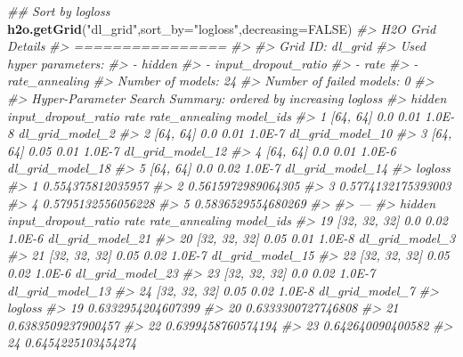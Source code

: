 \documentclass[]{book}
\newenvironment{Shaded}{\begin{snugshade}}{\end{snugshade}}
\newcommand{\CommentTok}[1]{\textcolor[rgb]{0.56,0.35,0.01}{\textit{#1}}}
\newcommand{\DataTypeTok}[1]{\textcolor[rgb]{0.13,0.29,0.53}{#1}}
\newcommand{\KeywordTok}[1]{\textcolor[rgb]{0.13,0.29,0.53}{\textbf{#1}}}
\newcommand{\NormalTok}[1]{#1}
\newcommand{\OtherTok}[1]{\textcolor[rgb]{0.56,0.35,0.01}{#1}}
\newcommand{\StringTok}[1]{\textcolor[rgb]{0.31,0.60,0.02}{#1}}
\begin{document}
\begin{Shaded}
\begin{Highlighting}[]
\CommentTok{## Sort by logloss}
\KeywordTok{h2o.getGrid}\NormalTok{(}\StringTok{"dl_grid"}\NormalTok{,}\DataTypeTok{sort_by=}\StringTok{"logloss"}\NormalTok{,}\DataTypeTok{decreasing=}\OtherTok{FALSE}\NormalTok{)}
\CommentTok{#> H2O Grid Details}
\CommentTok{#> ================}
\CommentTok{#> }
\CommentTok{#> Grid ID: dl_grid }
\CommentTok{#> Used hyper parameters: }
\CommentTok{#>   -  hidden }
\CommentTok{#>   -  input_dropout_ratio }
\CommentTok{#>   -  rate }
\CommentTok{#>   -  rate_annealing }
\CommentTok{#> Number of models: 24 }
\CommentTok{#> Number of failed models: 0 }
\CommentTok{#> }
\CommentTok{#> Hyper-Parameter Search Summary: ordered by increasing logloss}
\CommentTok{#>     hidden input_dropout_ratio rate rate_annealing        model_ids}
\CommentTok{#> 1 [64, 64]                 0.0 0.01         1.0E-8  dl_grid_model_2}
\CommentTok{#> 2 [64, 64]                 0.0 0.01         1.0E-7 dl_grid_model_10}
\CommentTok{#> 3 [64, 64]                0.05 0.01         1.0E-7 dl_grid_model_12}
\CommentTok{#> 4 [64, 64]                 0.0 0.01         1.0E-6 dl_grid_model_18}
\CommentTok{#> 5 [64, 64]                 0.0 0.02         1.0E-7 dl_grid_model_14}
\CommentTok{#>              logloss}
\CommentTok{#> 1  0.554375812035957}
\CommentTok{#> 2 0.5615972989064305}
\CommentTok{#> 3 0.5774132175393003}
\CommentTok{#> 4 0.5795132556056228}
\CommentTok{#> 5 0.5836529554680269}
\CommentTok{#> }
\CommentTok{#> ---}
\CommentTok{#>          hidden input_dropout_ratio rate rate_annealing        model_ids}
\CommentTok{#> 19 [32, 32, 32]                 0.0 0.02         1.0E-6 dl_grid_model_21}
\CommentTok{#> 20 [32, 32, 32]                0.05 0.01         1.0E-8  dl_grid_model_3}
\CommentTok{#> 21 [32, 32, 32]                0.05 0.02         1.0E-7 dl_grid_model_15}
\CommentTok{#> 22 [32, 32, 32]                0.05 0.02         1.0E-6 dl_grid_model_23}
\CommentTok{#> 23 [32, 32, 32]                 0.0 0.02         1.0E-7 dl_grid_model_13}
\CommentTok{#> 24 [32, 32, 32]                0.05 0.02         1.0E-8  dl_grid_model_7}
\CommentTok{#>               logloss}
\CommentTok{#> 19 0.6332954204607399}
\CommentTok{#> 20 0.6333300727746808}
\CommentTok{#> 21 0.6383509237900457}
\CommentTok{#> 22 0.6399458760574194}
\CommentTok{#> 23  0.642640090400582}
\CommentTok{#> 24 0.6454225103454274}


\end{Highlighting}
\end{Shaded}
\end{document}
